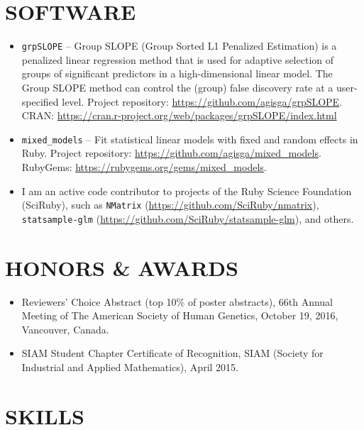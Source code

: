 \documentclass[margin]{res} %
\begin{document}
\begin{resume}
\section{SOFTWARE}

\begin{itemize} \itemsep -2pt %
    \item \verb!grpSLOPE! -- Group SLOPE (Group Sorted L1 Penalized Estimation) is a penalized linear regression method that is used for adaptive selection of groups of significant predictors in a high-dimensional linear model. The Group SLOPE method can control the (group) false discovery rate at a user-specified level. Project repository: \url{https://github.com/agisga/grpSLOPE}. CRAN: \url{https://cran.r-project.org/web/packages/grpSLOPE/index.html} 
    \item \verb!mixed_models! -- Fit statistical linear models with fixed and random effects in Ruby. Project repository: \url{https://github.com/agisga/mixed_models}. RubyGems: \url{https://rubygems.org/gems/mixed_models}.
    \item I am an active code contributor to projects of the Ruby Science Foundation (SciRuby), such as \verb!NMatrix! (\url{https://github.com/SciRuby/nmatrix}), \verb!statsample-glm! (\url{https://github.com/SciRuby/statsample-glm}), and others.
\end{itemize}

\section{HONORS \& AWARDS}

\begin{itemize}
  \item Reviewers’ Choice Abstract (top 10\% of poster abstracts), 66th Annual Meeting of The American Society of Human Genetics, October 19, 2016, Vancouver, Canada.
  \item SIAM Student Chapter Certificate of Recognition, SIAM (Society for Industrial and Applied Mathematics), April 2015.
\end{itemize}
 

\section{SKILLS} 


\end{resume}
\end{document}
